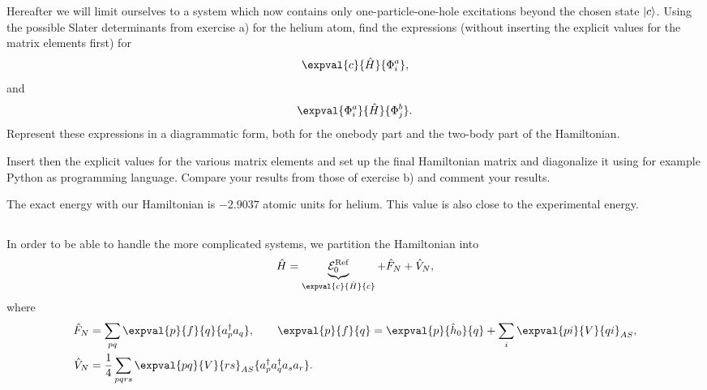 Hereafter we will limit ourselves to a system which now contains only one-particle-one-hole excitations beyond the chosen state $\lvert c\rangle$.
Using the possible Slater determinants from exercise a) for the helium atom, find the expressions (without inserting the explicit values for the matrix elements first) for %
\begin{equation*}
    \expval{c}{\hat{H}}{\Phi_i^a},
\end{equation*}
and
\begin{equation*}
    \expval{\Phi_i^a}{\hat{H}}{\Phi_j^b}.
\end{equation*}
Represent these expressions in a diagrammatic form, both for the onebody part and the two-body part of the Hamiltonian.

Insert then the explicit values for the various matrix elements and set up the final Hamiltonian matrix and diagonalize it using for example Python as programming language.
Compare your results from those of exercise b) and comment your results. %

The exact energy with our Hamiltonian is $-2.9037$ atomic units for helium.
This value is also close to the experimental energy.

\subsection{}
In order to be able to handle the more complicated systems, we partition the Hamiltonian into
\begin{equation}
    \hat{H} = \underbrace{\mathcal{E}_0^{\text{Ref}}}_{\expval{c}{\hat{H}}{c}} + \hat{F}_N + \hat{V}_N,
\end{equation}
where
\begin{align*}
    \hat{F}_N &= \sum_{pq} \expval{p}{f}{q} \{a_p^\dagger a_q\}, \qquad
    \expval{p}{f}{q} = \expval{p}{\hat{h}_0}{q} + \sum_{i} \expval{pi}{V}{qi}_{AS}, \\
    \hat{V}_N &= \frac{1}{4} \sum_{pqrs} \expval{pq}{V}{rs}_{AS} \{a_p^\dagger a_q^\dagger a_s a_r\}.
\end{align*}

